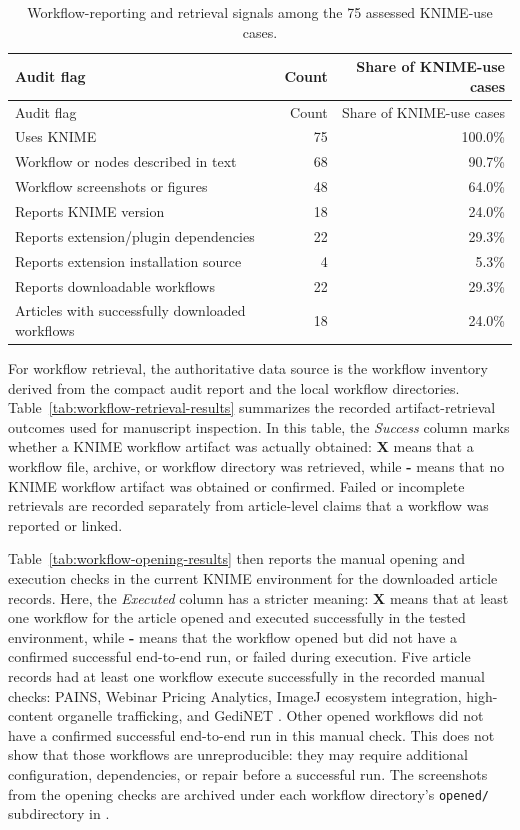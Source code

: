 \documentclass[runningheads]{llncs}
\begin{document}
\begingroup
\scriptsize
\renewcommand{\arraystretch}{1.18}
\begin{longtable}{|%
  >{\raggedright\arraybackslash}p{}|
  r|
  r|}
\caption{Workflow-reporting and retrieval signals among the 75 assessed KNIME-use cases.}
\label{tab:knime-use-assessment}\\
\toprule
Audit flag & Count & Share of KNIME-use cases \\
\midrule
\endfirsthead
\toprule
Audit flag & Count & Share of KNIME-use cases \\
\midrule
\endhead
\bottomrule
\endfoot
Uses KNIME & 75 & 100.0\% \\
Workflow or nodes described in text & 68 & 90.7\% \\
Workflow screenshots or figures & 48 & 64.0\% \\
Reports KNIME version & 18 & 24.0\% \\
Reports extension/plugin dependencies & 22 & 29.3\% \\
Reports extension installation source & 4 & 5.3\% \\
Reports downloadable workflows & 22 & 29.3\% \\
Articles with successfully downloaded workflows & 18 & 24.0\% \\
\end{longtable}
\endgroup

For workflow retrieval, the authoritative data source is the workflow inventory
derived from the compact audit report and the local workflow directories.
Table~\ref{tab:workflow-retrieval-results} summarizes the recorded
artifact-retrieval outcomes used for manuscript inspection. In this table, the
\emph{Success} column marks whether a KNIME workflow artifact was actually
obtained: \textbf{X} means that a workflow file, archive, or workflow directory
was retrieved, while \textbf{-} means that no KNIME workflow artifact was
obtained or confirmed. Failed or incomplete retrievals are recorded separately
from article-level claims that a workflow was reported or linked.

Table~\ref{tab:workflow-opening-results} then reports the manual opening and
execution checks in the current KNIME environment for the downloaded article
records. Here, the
\emph{Executed} column has a stricter meaning: \textbf{X} means that at least
one workflow for the article opened and executed successfully in the tested
environment, while \textbf{-} means that the workflow opened but did not have a
confirmed successful end-to-end run, or failed during execution. Five article
records had at least one workflow execute successfully in the recorded manual
checks: PAINS, Webinar Pricing Analytics, ImageJ ecosystem integration,
high-content organelle trafficking, and GediNET
\cite{Saubern2011PAINS,VillarroelOrdenes2021KNIMEHub,Dietz2020ImageJKNIME,Pal2018OrganelleKNIME,Qumsiyeh2022GediNET}.
Other opened workflows did not have a confirmed successful end-to-end run in
this manual check. This does not show that those workflows are unreproducible:
they may require additional configuration, dependencies, or repair before a
successful run. The screenshots from the opening checks are archived under
each workflow directory's \texttt{opened/} subdirectory in
.
\end{document}
